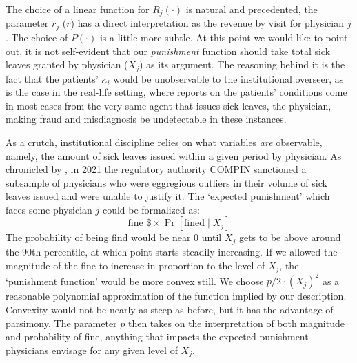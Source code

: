 \documentclass[../main.tex]{subfiles}
\begin{document}
The choice of a linear function for $R_j(\cdot)$ is natural and precedented, the parameter $r_j$ ($r$) has a direct interpretation as the revenue by visit for physician $j$. The choice of $P(\cdot)$ is a little more subtle. At this point we would like to point out, it is not self-evident that our \textit{punishment} function should take total sick leaves granted by physician ($X_j$) as its argument. The reasoning behind it is the fact that the patients' $\kappa_i$ would be unobservable to the institutional overseer, as is the case in the real-life setting, where reports on the patients' conditions come in most cases from the very same agent that issues sick leaves, the physician, making fraud and misdiagnosis be undetectable in these instances.

As a crutch, institutional discipline relies on what variables \textit{are} observable, namely, the amount of sick leaves issued within a given period by physician. As chronicled by \cite{oteiza}, in 2021 the regulatory authority COMPIN sanctioned a subsample of physicians who were eggregious outliers in their volume of sick leaves issued and were unable to justify it. The `expected punishment' which faces some physician $j$ could be formalized as:
\[
\text{fine\_\$} \times \operatorname{Pr}[\text{fined} \mid X_j]
\]
The probability of being find would be near 0 until $X_j$ gets to be above around the 90th percentile, at which point starts steadily increasing. If we allowed the magnitude of the fine to increase in proportion to the level of $X_j$, the `punishment function' would be more convex still. We choose $p / 2 \cdot (X_j)^2$ as a reasonable polynomial approximation of the function implied by our description. Convexity would not be nearly as steep as before, but it has the advantage of parsimony. The parameter $p$ then takes on the interpretation of both magnitude and probability of fine, anything that impacts the expected punishment physicians envisage for any given level of $X_j$.
\end{document}
